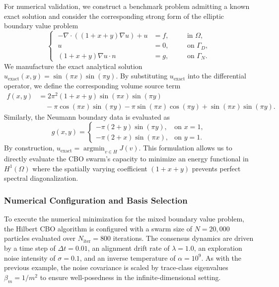 \documentclass[12pt]{amsart}
\DeclareMathOperator*{\argmin}{argmin}
\numberwithin{equation}{section}
\begin{document}
For numerical validation, we construct a benchmark problem admitting a known exact solution and consider the corresponding strong form of the elliptic boundary value problem
\begin{equation*}
\left\{\;
\begin{aligned}
    -\nabla\cdot\left((1+x+y)\nabla u\right)+u &= f, && \quad \text{in }\Omega, \\
    u &= 0, && \quad \text{on }\Gamma_D, \\
    (1+x+y)\nabla u\cdot n &= g, && \quad \text{on }\Gamma_N.
\end{aligned}
\right.
\end{equation*}
We manufacture the exact analytical solution $u_{\mathrm{exact}}(x,y) = \sin(\pi x)\sin(\pi y)$. 
By substituting $u_{\mathrm{exact}}$ into the differential operator, we define the corresponding volume source term
\begin{equation*}
\begin{aligned}
f(x,y) &= 2\pi^2(1+x+y)\sin(\pi x)\sin(\pi y) \\
    &\quad - \pi\cos(\pi x)\sin(\pi y) - \pi\sin(\pi x)\cos(\pi y) + \sin(\pi x)\sin(\pi y).
\end{aligned}
\end{equation*}
Similarly, the Neumann boundary data is evaluated as
\begin{equation*}
g(x,y) =
\begin{cases}
-\pi(2+y)\sin(\pi y), & \text{on } x=1, \\
-\pi(2+x)\sin(\pi x), & \text{on } y=1.
\end{cases}
\end{equation*}
By construction, $u_{\mathrm{exact}} = \argmin_{v\in H}J(v)$. This formulation allows us to directly evaluate the CBO swarm's capacity to minimize an energy functional in $H^1(\Omega)$ where the spatially varying coefficient $(1+x+y)$ prevents perfect spectral diagonalization.

\subsubsection*{Numerical Configuration and Basis Selection}

To execute the numerical minimization for the mixed boundary value problem, the Hilbert CBO algorithm is configured with a swarm size of $N = 20{,}000$ particles evaluated over $N_{\text{iter}} = 800$ iterations. The consensus dynamics are driven by a time step of $\Delta t = 0.01$, an alignment drift rate of $\lambda = 1.0$, an exploration noise intensity of $\sigma = 0.1$, and an inverse temperature of $\alpha = 10^9$. As with the previous example, the noise covariance is scaled by trace-class eigenvalues $\beta_{m} = 1/m^2$ to ensure well-posedness in the infinite-dimensional setting.
\end{document}
